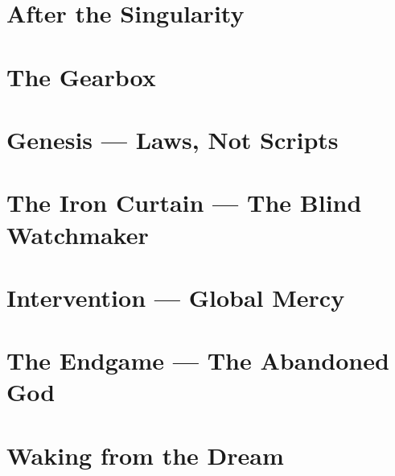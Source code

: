 \documentclass[11pt,a4paper,twoside]{book}
\begin{document}
\chapter{After the Singularity}


\chapter{The Gearbox}




\chapter{Genesis --- Laws, Not Scripts}


\chapter{The Iron Curtain --- The Blind Watchmaker}


\chapter{Intervention --- Global Mercy}



\chapter{The Endgame --- The Abandoned God}



\chapter{Waking from the Dream}



\end{document}
